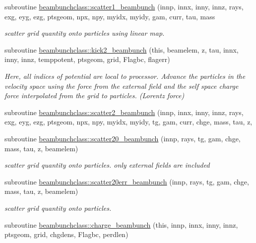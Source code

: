 \begin{DoxyCompactItemize}
subroutine \mbox{\hyperlink{namespacebeambunchclass_a023a12f9279f0764fc57deda1bcb852f}{beambunchclass\+::scatter1\+\_\+beambunch}} (innp, innx, inny, innz, rays, exg, eyg, ezg, ptsgeom, npx, npy, myidx, myidy, gam, curr, tau, mass
\begin{DoxyCompactList}\small\item\em scatter grid quantity onto particles using linear map. \end{DoxyCompactList}\item 
subroutine \mbox{\hyperlink{namespacebeambunchclass_a398a8735bfae34f0d7a9337c8e5ec621}{beambunchclass\+::kick2\+\_\+beambunch}} (this, beamelem, z, tau, innx, inny, innz, temppotent, ptsgeom, grid, Flagbc, flagerr)
\begin{DoxyCompactList}\small\item\em Here, all indices of potential are local to processor. Advance the particles in the velocity space using the force from the external field and the self space charge force interpolated from the grid to particles. (Lorentz force) \end{DoxyCompactList}\item 
subroutine \mbox{\hyperlink{namespacebeambunchclass_ad2054e6e5714a86db0112c5eb3978abb}{beambunchclass\+::scatter2\+\_\+beambunch}} (innp, innx, inny, innz, rays, exg, eyg, ezg, ptsgeom, npx, npy, myidx, myidy, tg, gam, curr, chge, mass, tau, z,
\item 
subroutine \mbox{\hyperlink{namespacebeambunchclass_a8a96c99996275cf03ceec41dc011695e}{beambunchclass\+::scatter20\+\_\+beambunch}} (innp, rays, tg, gam, chge, mass, tau, z, beamelem)
\begin{DoxyCompactList}\small\item\em scatter grid quantity onto particles. only external fields are included \end{DoxyCompactList}\item 
subroutine \mbox{\hyperlink{namespacebeambunchclass_add3fe05fd157f9a0d3f09445660f038e}{beambunchclass\+::scatter20err\+\_\+beambunch}} (innp, rays, tg, gam, chge, mass, tau, z, beamelem)
\begin{DoxyCompactList}\small\item\em scatter grid quantity onto particles. \end{DoxyCompactList}\item 
subroutine \mbox{\hyperlink{namespacebeambunchclass_a91563d467d36ccca8231ee2c62483246}{beambunchclass\+::charge\+\_\+beambunch}} (this, innp, innx, inny, innz, ptsgeom, grid, chgdens, Flagbc, perdlen)

\end{DoxyCompactItemize}
